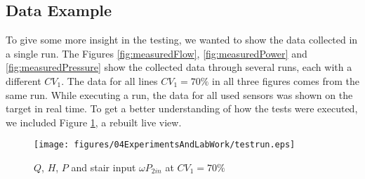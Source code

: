 \subsection{Data Example}%
To give some more insight in the testing,
we wanted to show the data collected in a single run.
The Figures \ref{fig:measuredFlow}, \ref{fig:measuredPower} and \ref{fig:measuredPressure}
show the collected data through several runs,
each with a different $CV_1$.
The data for all lines $CV_1 = 70\%$ in all three figures comes from the same run.
While executing a run,
the data for all used sensors was shown on the target in real time.
To get a better understanding of how the tests were executed,
we included Figure \ref{fig:testrun},
a rebuilt live view.

\begin{figure}[H]
	\centering
	\texttt{[image: figures/04ExperimentsAndLabWork/testrun.eps]}
	\caption{$Q$, $H$, $P$ and stair input $\omega P_{2in}$ at $CV_1 = 70\%$}
	\label{fig:testrun}
\end{figure}
